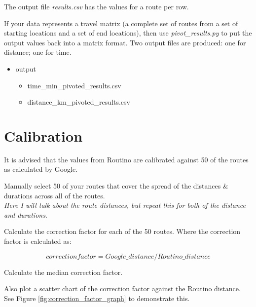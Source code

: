 \documentclass{article}
\begin{document}
\begin{flushleft}
The output file \textit{results.csv} has the values for a route per row.\\

\vspace{\baselineskip}

If your data represents a travel matrix (a complete set of routes from a set of starting locations and a set of end locations), then use \textit{pivot\_results.py} to put the output values back into a matrix format.
Two output files are produced: one for distance; one for time.

\begin{itemize}
	\item output
	\begin{itemize}
		\item time\_min\_pivoted\_results.csv
		\item distance\_km\_pivoted\_results.csv
	\end{itemize}
\end{itemize}


\section{Calibration}
It is advised that the values from Routino are calibrated against 50 of the routes as calculated by Google.\\

\vspace{\baselineskip}

Manually select 50 of your routes that cover the spread of the distances \& durations across all of the routes.\\

\vspace{\baselineskip}
\textit{Here I will talk about the route distances, but repeat this for both of the distance and durations}. 

\vspace{\baselineskip}
Calculate the correction factor for each of the 50 routes. Where the correction factor is calculated as:

\[ correction factor = Google\_distance / Routino\_distance \]

Calculate the median correction factor. 
\vspace{\baselineskip}

Also plot a scatter chart of the correction factor against the Routino distance. See Figure \ref{fig:correction_factor_graph} to demonstrate this.



\end{flushleft}
\end{document}
